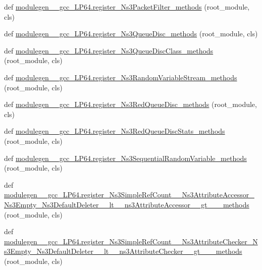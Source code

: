 \begin{DoxyCompactItemize}
\item 
def \hyperlink{namespacemodulegen____gcc__LP64_a29f41a16b668deab89639db7d56df38f}{modulegen\+\_\+\+\_\+gcc\+\_\+\+L\+P64.\+register\+\_\+\+Ns3\+Packet\+Filter\+\_\+methods} (root\+\_\+module, cls)
\item 
def \hyperlink{namespacemodulegen____gcc__LP64_a47e225b087b98b2940361cca1fa91255}{modulegen\+\_\+\+\_\+gcc\+\_\+\+L\+P64.\+register\+\_\+\+Ns3\+Queue\+Disc\+\_\+methods} (root\+\_\+module, cls)
\item 
def \hyperlink{namespacemodulegen____gcc__LP64_a0bd01ea7a5994c63523bc7ccdf58b1f3}{modulegen\+\_\+\+\_\+gcc\+\_\+\+L\+P64.\+register\+\_\+\+Ns3\+Queue\+Disc\+Class\+\_\+methods} (root\+\_\+module, cls)
\item 
def \hyperlink{namespacemodulegen____gcc__LP64_a8b671930ca330fd0dced5e07fc408a71}{modulegen\+\_\+\+\_\+gcc\+\_\+\+L\+P64.\+register\+\_\+\+Ns3\+Random\+Variable\+Stream\+\_\+methods} (root\+\_\+module, cls)
\item 
def \hyperlink{namespacemodulegen____gcc__LP64_affd8942b7ace19561f8af27976a05c6c}{modulegen\+\_\+\+\_\+gcc\+\_\+\+L\+P64.\+register\+\_\+\+Ns3\+Red\+Queue\+Disc\+\_\+methods} (root\+\_\+module, cls)
\item 
def \hyperlink{namespacemodulegen____gcc__LP64_a07df55ef8e77e680944b5d811cee309c}{modulegen\+\_\+\+\_\+gcc\+\_\+\+L\+P64.\+register\+\_\+\+Ns3\+Red\+Queue\+Disc\+Stats\+\_\+methods} (root\+\_\+module, cls)
\item 
def \hyperlink{namespacemodulegen____gcc__LP64_a96820d493e18dbe2fe013127aaf73ae8}{modulegen\+\_\+\+\_\+gcc\+\_\+\+L\+P64.\+register\+\_\+\+Ns3\+Sequential\+Random\+Variable\+\_\+methods} (root\+\_\+module, cls)
\item 
def \hyperlink{namespacemodulegen____gcc__LP64_a9b358364d845a1ffcabb6be20a325b9d}{modulegen\+\_\+\+\_\+gcc\+\_\+\+L\+P64.\+register\+\_\+\+Ns3\+Simple\+Ref\+Count\+\_\+\+\_\+\+Ns3\+Attribute\+Accessor\+\_\+\+Ns3\+Empty\+\_\+\+Ns3\+Default\+Deleter\+\_\+\+\_\+lt\+\_\+\+\_\+ns3\+Attribute\+Accessor\+\_\+\+\_\+gt\+\_\+\+\_\+\+\_\+methods} (root\+\_\+module, cls)
\item 
def \hyperlink{namespacemodulegen____gcc__LP64_acc11c420e32471422fd00230d89398af}{modulegen\+\_\+\+\_\+gcc\+\_\+\+L\+P64.\+register\+\_\+\+Ns3\+Simple\+Ref\+Count\+\_\+\+\_\+\+Ns3\+Attribute\+Checker\+\_\+\+Ns3\+Empty\+\_\+\+Ns3\+Default\+Deleter\+\_\+\+\_\+lt\+\_\+\+\_\+ns3\+Attribute\+Checker\+\_\+\+\_\+gt\+\_\+\+\_\+\+\_\+methods} (root\+\_\+module, cls)
\item 

\end{DoxyCompactItemize}
